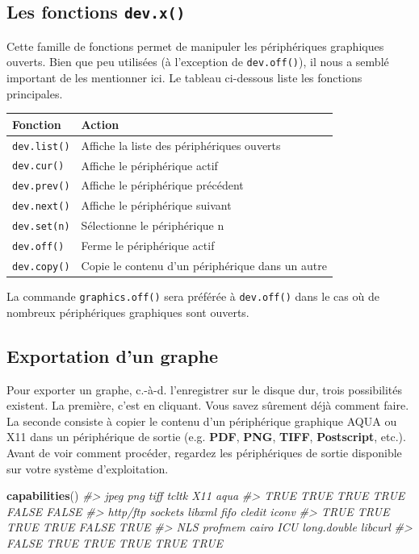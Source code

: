 \documentclass[]{article}
\newenvironment{Shaded}{\begin{snugshade}}{\end{snugshade}}
\newcommand{\CommentTok}[1]{\textcolor[rgb]{0.56,0.35,0.01}{\textit{#1}}}
\newcommand{\KeywordTok}[1]{\textcolor[rgb]{0.13,0.29,0.53}{\textbf{#1}}}
\newcommand{\NormalTok}[1]{#1}
\begin{document}
\hypertarget{les-fonctions-dev.x}{%
\subsection{\texorpdfstring{Les fonctions \texttt{dev.x()}}{Les fonctions dev.x()}}\label{les-fonctions-dev.x}}

Cette famille de fonctions permet de manipuler les périphériques graphiques ouverts. Bien que peu utilisées (à l'exception de \texttt{dev.off()}), il nous a semblé important de les mentionner ici. Le tableau ci-dessous liste les fonctions principales.

\begin{longtable}[]{@{}ll@{}}
\toprule
\textbf{Fonction} & \textbf{Action}\tabularnewline
\midrule
\endhead
\texttt{dev.list()} & Affiche la liste des périphériques ouverts\tabularnewline
\texttt{dev.cur()} & Affiche le périphérique actif\tabularnewline
\texttt{dev.prev()} & Affiche le périphérique précédent\tabularnewline
\texttt{dev.next()} & Affiche le périphérique suivant\tabularnewline
\texttt{dev.set(n)} & Sélectionne le périphérique n\tabularnewline
\texttt{dev.off()} & Ferme le périphérique actif\tabularnewline
\texttt{dev.copy()} & Copie le contenu d'un périphérique dans un autre\tabularnewline
\bottomrule
\end{longtable}

La commande \texttt{graphics.off()} sera préférée à \texttt{dev.off()} dans le cas où de nombreux périphériques graphiques sont ouverts.

\hypertarget{exportation-dun-graphe}{%
\subsection{Exportation d'un graphe}\label{exportation-dun-graphe}}

Pour exporter un graphe, c.-à-d. l'enregistrer sur le disque dur, trois possibilités existent. La première, c'est en cliquant. Vous savez sûrement déjà comment faire. La seconde consiste à copier le contenu d'un périphérique graphique AQUA ou X11 dans un périphérique de sortie (e.g. \textbf{PDF}, \textbf{PNG}, \textbf{TIFF}, \textbf{Postscript}, etc.).
Avant de voir comment procéder, regardez les périphériques de sortie disponible sur votre système d'exploitation.

\begin{Shaded}
\begin{Highlighting}[]
\KeywordTok{capabilities}\NormalTok{()}
\CommentTok{#>        jpeg         png        tiff       tcltk         X11        aqua }
\CommentTok{#>        TRUE        TRUE        TRUE        TRUE       FALSE       FALSE }
\CommentTok{#>    http/ftp     sockets      libxml        fifo      cledit       iconv }
\CommentTok{#>        TRUE        TRUE        TRUE        TRUE       FALSE        TRUE }
\CommentTok{#>         NLS     profmem       cairo         ICU long.double     libcurl }
\CommentTok{#>       FALSE        TRUE        TRUE        TRUE        TRUE        TRUE}
\end{Highlighting}
\end{Shaded}
\end{document}
